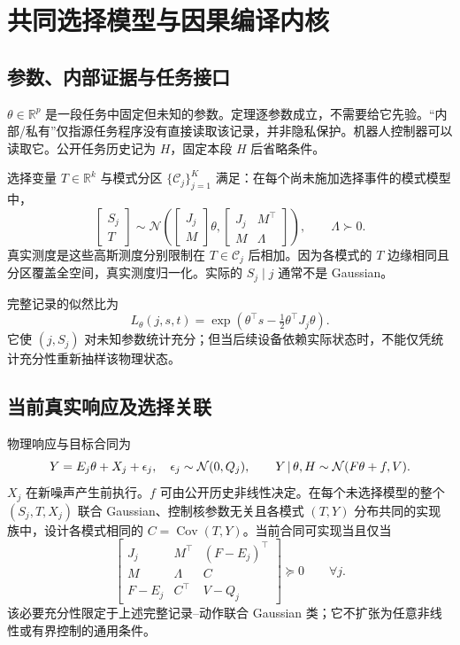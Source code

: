 \documentclass[UTF8,fontset=fandol,zihao=5,a4paper]{ctexart}
\newcommand{\R}{\mathbb R}\newcommand{\N}{\mathcal N}
\DeclareMathOperator{\Cov}{Cov}\DeclareMathOperator{\im}{im}
\theoremstyle{definition}
\theoremstyle{remark}\newtheorem{remark}[theorem]{说明}
\numberwithin{equation}{section}
\begin{document}
\section{共同选择模型与因果编译内核}
\label{sec:core}
\subsection{参数、内部证据与任务接口}
$\theta\in\R^p$ 是一段任务中固定但未知的参数。定理逐参数成立，不需要给它先验。“内部/私有”仅指源任务程序没有直接读取该记录，并非隐私保护。机器人控制器可以读取它。公开任务历史记为 $H$，固定本段 $H$ 后省略条件。

选择变量 $T\in\R^k$ 与模式分区 $\{\mathcal C_j\}_{j=1}^K$ 满足：在每个尚未施加选择事件的模式模型中，
\begin{equation}
\begin{bmatrix}S_j\\T\end{bmatrix}
\sim\N\!\left(\begin{bmatrix}J_j\\M\end{bmatrix}\theta,
\begin{bmatrix}J_j&M^\top\\M&\Lambda\end{bmatrix}\right),
\qquad \Lambda\succ0.
\label{eq:base}
\end{equation}
真实测度是这些高斯测度分别限制在 $T\in\mathcal C_j$ 后相加。因为各模式的 $T$ 边缘相同且分区覆盖全空间，真实测度归一化。实际的 $S_j\mid j$ 通常不是 Gaussian。

完整记录的似然比为
\begin{equation}
L_\theta(j,s,t)
=\exp\!\left(\theta^\top s-\tfrac12\theta^\top J_j\theta\right).
\label{eq:lr}
\end{equation}
它使 $(j,S_j)$ 对未知参数统计充分；但当后续设备依赖实际状态时，不能仅凭统计充分性重新抽样该物理状态。

\subsection{当前真实响应及选择关联}
物理响应与目标合同为
\begin{equation}
Y=E_j\theta+X_j+\epsilon_j,\quad \epsilon_j\sim\N(0,Q_j),
\qquad Y\given\theta,H\sim\N(F\theta+f,V).
\label{eq:physicalbase}
\end{equation}
$X_j$ 在新噪声产生前执行。$f$ 可由公开历史非线性决定。在每个未选择模型的整个 $(S_j,T,X_j)$ 联合 Gaussian、控制核参数无关且各模式 $(T,Y)$ 分布共同的实现族中，设计各模式相同的 $C=\Cov(T,Y)$。当前合同可实现当且仅当
\begin{equation}
\begin{bmatrix}
J_j&M^\top&(F-E_j)^\top\\
M&\Lambda&C\\
F-E_j&C^\top&V-Q_j
\end{bmatrix}\succeq0\qquad\forall j.
\label{eq:basegate}
\end{equation}
该必要充分性限定于上述完整记录--动作联合 Gaussian 类；它不扩张为任意非线性或有界控制的通用条件。
\end{document}
